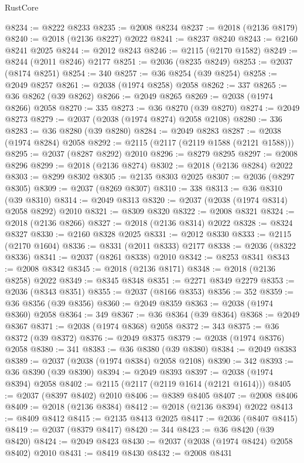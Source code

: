 \begin{lexlean}{RustCore}
\begin{coremodule}
@8234 := @8222 @8233
@8235 := @2008 @8234
@8237 := @2018 (@2136 @8179)
@8240 := @2018 (@2136 @8227) @2022
@8241 := @8237 @8240
@8243 := @2160 @8241 @2025
@8244 := @2012 @8243
@8246 := @2115 (@2170 @1582)
@8249 := @8244 (@2011 @8246) @2177
@8251 := @2036 (@8235 @8249)
@8253 := @2037 (@8174 @8251)
@8254 := 340
@8257 := @36 @8254 (@39 @8254)
@8258 := @2049 @8257
@8261 := @2038 (@1974 @8258) @2058
@8262 := 337
@8265 := @36 @8262 (@39 @8262)
@8266 := @2049 @8265
@8269 := @2038 (@1974 @8266) @2058
@8270 := 335
@8273 := @36 @8270 (@39 @8270)
@8274 := @2049 @8273
@8279 := @2037 (@2038 (@1974 @8274) @2058 @2108)
@8280 := 336
@8283 := @36 @8280 (@39 @8280)
@8284 := @2049 @8283
@8287 := @2038 (@1974 @8284) @2058
@8292 := @2115 (@2117 (@2119 @1588 (@2121 @1588)))
@8295 := @2037 (@8287 @8292) @2010
@8296 := @8279 @8295
@8297 := @2008 @8296
@8299 := @2018 (@2136 @8274)
@8302 := @2018 (@2136 @8284) @2022
@8303 := @8299 @8302
@8305 := @2135 @8303 @2025
@8307 := @2036 (@8297 @8305)
@8309 := @2037 (@8269 @8307)
@8310 := 338
@8313 := @36 @8310 (@39 @8310)
@8314 := @2049 @8313
@8320 := @2037 (@2038 (@1974 @8314) @2058 @8292) @2010
@8321 := @8309 @8320
@8322 := @2008 @8321
@8324 := @2018 (@2136 @8266)
@8327 := @2018 (@2136 @8314) @2022
@8328 := @8324 @8327
@8330 := @2160 @8328 @2025
@8331 := @2012 @8330
@8333 := @2115 (@2170 @1604)
@8336 := @8331 (@2011 @8333) @2177
@8338 := @2036 (@8322 @8336)
@8341 := @2037 (@8261 @8338) @2010
@8342 := @8253 @8341
@8343 := @2008 @8342
@8345 := @2018 (@2136 @8171)
@8348 := @2018 (@2136 @8258) @2022
@8349 := @8345 @8348
@8351 := @2271 @8349 @2279
@8353 := @2036 (@8343 @8351)
@8355 := @2037 (@8166 @8353)
@8356 := 352
@8359 := @36 @8356 (@39 @8356)
@8360 := @2049 @8359
@8363 := @2038 (@1974 @8360) @2058
@8364 := 349
@8367 := @36 @8364 (@39 @8364)
@8368 := @2049 @8367
@8371 := @2038 (@1974 @8368) @2058
@8372 := 343
@8375 := @36 @8372 (@39 @8372)
@8376 := @2049 @8375
@8379 := @2038 (@1974 @8376) @2058
@8380 := 341
@8383 := @36 @8380 (@39 @8380)
@8384 := @2049 @8383
@8389 := @2037 (@2038 (@1974 @8384) @2058 @2108)
@8390 := 342
@8393 := @36 @8390 (@39 @8390)
@8394 := @2049 @8393
@8397 := @2038 (@1974 @8394) @2058
@8402 := @2115 (@2117 (@2119 @1614 (@2121 @1614)))
@8405 := @2037 (@8397 @8402) @2010
@8406 := @8389 @8405
@8407 := @2008 @8406
@8409 := @2018 (@2136 @8384)
@8412 := @2018 (@2136 @8394) @2022
@8413 := @8409 @8412
@8415 := @2135 @8413 @2025
@8417 := @2036 (@8407 @8415)
@8419 := @2037 (@8379 @8417)
@8420 := 344
@8423 := @36 @8420 (@39 @8420)
@8424 := @2049 @8423
@8430 := @2037 (@2038 (@1974 @8424) @2058 @8402) @2010
@8431 := @8419 @8430
@8432 := @2008 @8431

\end{coremodule}
\end{lexlean}

